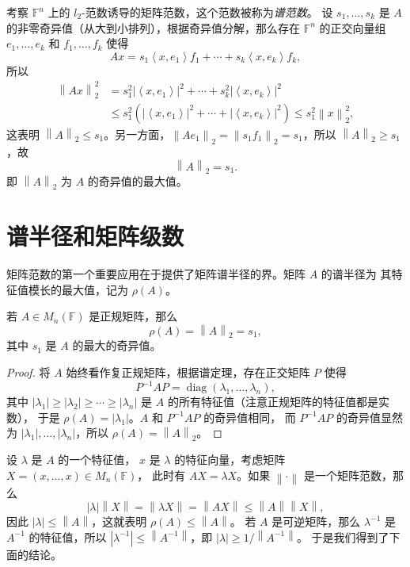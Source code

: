 \documentclass[fontset=none,zihao=-4]{Notes}
\DeclareMathOperator\diag{diag}
\newcommand{\inn}[1]{\left\langle#1\right\rangle}
\newcommand{\norm}[1]{\left\lVert#1\right\rVert}
\begin{document}
\begin{example}\label{exa:matrix 2-norm}
  考察 $\mathbb{F}^n$ 上的 $l_2$-范数诱导的矩阵范数，这个范数被称为\emph{谱范数}。
  设 $s_1,\dots,s_k$ 是 $A$ 的非零奇异值（从大到小排列），根据奇异值分解，那么存在 $\mathbb{F}^n$ 的正交向量组
  $e_1,\dots,e_k$ 和 $f_1,\dots,f_k$ 使得
  \[
    Ax=s_1\inn{x,e_1}f_1+\cdots+s_k\inn{x,e_k}f_k,  
  \]
  所以
  \begin{align*}
    \norm{Ax}_2^2&=s_1^2\left|\inn{x,e_1}\right|^2+\cdots+s_k^2\left|\inn{x,e_k}\right|^2\\
    &\leq s_1^2\left(\left|\inn{x,e_1}\right|^2+\cdots+\left|\inn{x,e_k}\right|^2\right)\leq s_1^2 \norm{x}_2^2,
  \end{align*}
  这表明 $\norm{A}_2\leq s_1$。另一方面，$\norm{Ae_1}_2=\norm{s_1f_1}_2=s_1$，所以
  $\norm{A}_2\geq s_1$，故
  \[
    \norm{A}_2=s_1.  
  \]
  即 $\norm{A}_2$ 为 $A$ 的奇异值的最大值。
\end{example}


\section{谱半径和矩阵级数}

矩阵范数的第一个重要应用在于提供了矩阵谱半径的界。矩阵 $A$ 的谱半径为
其特征值模长的最大值，记为 $\rho(A)$。

\begin{proposition}\label{prop:matrix 2-norm of normal matrix}
  若 $A\in M_n(\mathbb{F})$ 是正规矩阵，那么
  \[
    \rho(A)=\norm{A}_2=s_1,
  \]
  其中 $s_1$ 是 $A$ 的最大的奇异值。
\end{proposition}
\begin{proof}
  将 $A$ 始终看作复正规矩阵，根据谱定理，存在正交矩阵 $P$ 使得
  \[
    P^{-1}AP=\diag(\lambda_1,\dots,\lambda_n),  
  \]
  其中 $|\lambda_1|\geq|\lambda_2|\geq\cdots\geq|\lambda_n|$ 是 $A$ 的所有特征值（注意正规矩阵的特征值都是实数），
  于是 $\rho(A)=|\lambda_1|$。$A$ 和 $P^{-1}AP$ 的奇异值相同，
  而 $P^{-1}AP$ 的奇异值显然为 $|\lambda_1|,\dots,|\lambda_n|$，所以
  $\rho(A)=\norm{A}_2$。
\end{proof}

设 $\lambda$ 是 $A$ 的一个特征值，
$x$ 是 $\lambda$ 的特征向量，考虑矩阵 $X=(x,\dots,x)\in M_n(\mathbb{F})$，
此时有 $AX=\lambda X$。如果 $\norm{\cdot}$ 是一个矩阵范数，那么
\[
  |\lambda|\norm{X}=\norm{\lambda X}=\norm{AX}\leq \norm{A}\norm{X},  
\]
因此 $|\lambda|\leq\norm{A}$，这就表明 $\rho(A)\leq\norm{A}$。
若 $A$ 是可逆矩阵，那么 $\lambda^{-1}$ 是 $A^{-1}$ 的特征值，所以
$|\lambda^{-1}|\leq\norm{A^{-1}}$，即 $|\lambda|\geq 1/\norm{A^{-1}}$。
于是我们得到了下面的结论。
\end{document}

